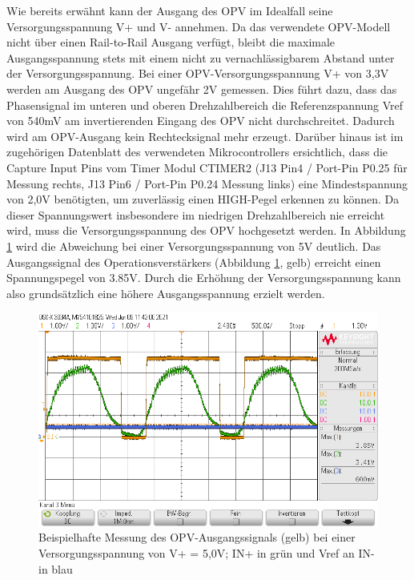 Wie bereits erwähnt kann der Ausgang des OPV im Idealfall seine Versorgungsspannung V+ und V- annehmen. Da das verwendete OPV-Modell nicht über einen Rail-to-Rail Ausgang verfügt, bleibt die maximale Ausgangsspannung stets mit einem nicht zu vernachlässigbarem Abstand unter der Versorgungsspannung. Bei einer \ac{OPV}-Versorgungsspannung V+ von 3,3V werden am Ausgang des OPV ungefähr 2V gemessen. Dies führt dazu, dass das Phasensignal im unteren und oberen Drehzahlbereich die Referenzspannung Vref von 540mV am invertierenden Eingang des OPV nicht durchschreitet. Dadurch wird am OPV-Ausgang kein Rechtecksignal mehr erzeugt. Darüber hinaus ist im zugehörigen Datenblatt des verwendeten Mikrocontrollers ersichtlich, dass die Capture Input Pins vom Timer Modul CTIMER2 (J13 Pin4 / Port-Pin P0.25 für Messung rechts, J13 Pin6 / Port-Pin P0.24 Messung links) eine Mindestspannung von 2,0V benötigten, um zuverlässig einen HIGH-Pegel erkennen zu können. Da dieser Spannungswert insbesondere im niedrigen Drehzahlbereich nie erreicht wird, muss die Versorgungsspannung des OPV hochgesetzt werden. In Abbildung \ref{fig:inpInrefOpvOut} wird die Abweichung bei einer Versorgungsspannung von 5V deutlich. Das Ausgangssignal des Operationsverstärkers (Abbildung \ref{fig:inpInrefOpvOut}, gelb) erreicht einen Spannungspegel von 3.85V. Durch die Erhöhung der Versorgungsspannung kann also grundsätzlich eine höhere Ausgangsspannung erzielt werden.

\begin{figure}[H] %
\includegraphics[width=.95\textwidth]{sec4/images/inp_inref_opv_out} 
\centering
\captionsetup{width=.95\textwidth}
\caption[Beispielhafte Messung des OPV-Ausgangssignals bei V+ = 5,0V;]{Beispielhafte Messung des OPV-Ausgangssignals (gelb) bei einer Versorgungsspannung von V+ = 5,0V;  IN+ in grün und Vref an IN- in blau}\centering
\label{fig:inpInrefOpvOut}
\end{figure}

